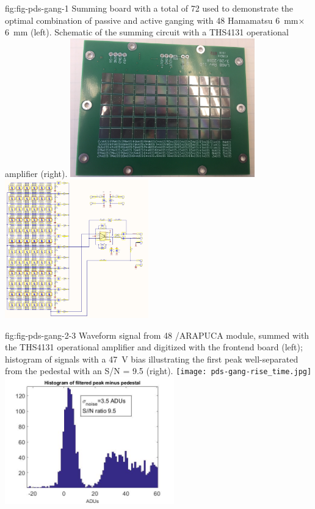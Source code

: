 \begin{dunefigure}
 {fig:fig-pds-gang-1}
 {Summing board with a total of 72  used to demonstrate the optimal combination of passive and active ganging with 48 Hamamatsu \SI{6}{mm}$\times$\SI{6}{mm}  (left).  Schematic of the summing circuit with a THS4131 operational amplifier (right).}
\includegraphics[height=6cm]{graphics/pds_gang_fig1.jpg}
\includegraphics[height=6cm]{graphics/pds_gang_fig2.png}
\end{dunefigure}



\begin{dunefigure}
 {fig:fig-pds-gang-2-3}
 {Waveform signal from 48 /ARAPUCA module, summed with the THS4131 operational amplifier and digitized with the  frontend board (left); histogram of signals with a 47~V bias illustrating the first \phel peak well-separated from the pedestal with an S/N = 9.5 (right).}
\texttt{[image: pds-gang-rise\_time.jpg]}
\includegraphics[height=5.5cm]{graphics/pds-gang48-47v.jpg}
\end{dunefigure}

